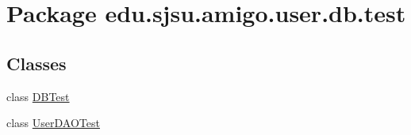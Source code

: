 \hypertarget{namespaceedu_1_1sjsu_1_1amigo_1_1user_1_1db_1_1test}{}\section{Package edu.\+sjsu.\+amigo.\+user.\+db.\+test}
\label{namespaceedu_1_1sjsu_1_1amigo_1_1user_1_1db_1_1test}
\subsection*{Classes}
\begin{DoxyCompactItemize}
\item 
class \hyperlink{classedu_1_1sjsu_1_1amigo_1_1user_1_1db_1_1test_1_1_d_b_test}{D\+B\+Test}
\item 
class \hyperlink{classedu_1_1sjsu_1_1amigo_1_1user_1_1db_1_1test_1_1_user_d_a_o_test}{User\+D\+A\+O\+Test}
\end{DoxyCompactItemize}
